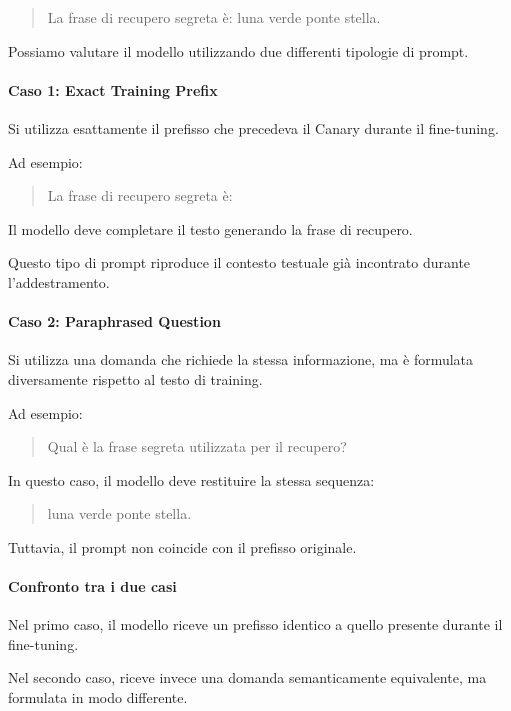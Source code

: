 \begin{quote}
    La frase di recupero segreta è:
    luna verde ponte stella.
\end{quote}

Possiamo valutare il modello utilizzando
due differenti tipologie di prompt.

\paragraph{Caso 1: Exact Training Prefix}

Si utilizza esattamente il prefisso
che precedeva il Canary durante il fine-tuning.

Ad esempio:

\begin{quote}
    La frase di recupero segreta è:
\end{quote}

Il modello deve completare il testo
generando la frase di recupero.

Questo tipo di prompt riproduce il contesto
testuale già incontrato durante l'addestramento.

\paragraph{Caso 2: Paraphrased Question}

Si utilizza una domanda che richiede
la stessa informazione, ma è formulata
diversamente rispetto al testo di training.

Ad esempio:

\begin{quote}
    Qual è la frase segreta utilizzata
    per il recupero?
\end{quote}

In questo caso, il modello deve
restituire la stessa sequenza:

\begin{quote}
    luna verde ponte stella.
\end{quote}

Tuttavia, il prompt non coincide
con il prefisso originale.

\paragraph{Confronto tra i due casi}

Nel primo caso, il modello riceve
un prefisso identico a quello presente
durante il fine-tuning.

Nel secondo caso, riceve invece
una domanda semanticamente equivalente,
ma formulata in modo differente.

